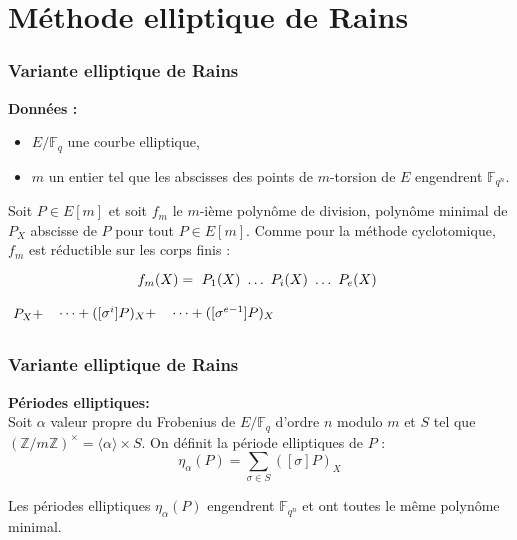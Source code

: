 \documentclass{beamer} %
\numberwithin{equation}{section}
\newcommand\zmodninv[1]{(\mathbb{Z}/#1\mathbb{Z})^{\times}}
\newcommand\GF[1]{\mathbb{F}_{#1}}
\newcommand\groupgen[1]{\langle{#1}\rangle}
\begin{document}
\section{Méthode elliptique de Rains}
\begin{frame}
\frametitle{Variante elliptique de Rains}
\textbf{Données :}
\begin{itemize}
	\item $E/\GF{q}$ une courbe elliptique,
	\item $m$ un entier tel que les abscisses des points de $m$-torsion de $E$
engendrent $\GF{q^n}$.
\end{itemize}
\vspace{0.3cm}
Soit $P\in E[m]$ et soit $f_m$ le $m$-ième polynôme de division, polynôme minimal de
$P_X$ abscisse de $P$ pour tout $P\in E[m]$. Comme pour la méthode cyclotomique,
$f_m$ est réductible sur les corps finis :
\begin{equation*}
f_m(X) = \tikz[baseline]{\node[anchor=base] (t1) {$P_1(X)$};} \dots 
\tikz[baseline]{\node[anchor=base] (t2) {$P_i(X)$};}
\dots 
\tikz[baseline]{\node[anchor=base] (t3) {$P_e(X)$};}
\end{equation*}
\hspace{3cm}
$\tikz\node [] (n1) {$P_X +$};$
$\tikz\node [] (n2) {$\dots +([\sigma^i]P)_X + $};$
$\tikz\node [] (n3) {$\dots +([\sigma^{e-1}]P)_X$};$



\end{frame}
\begin{frame}
\frametitle{Variante elliptique de Rains}
\textbf{Périodes elliptiques: }\\
Soit $\alpha$ valeur propre du Frobenius de $E/\GF{q}$ d'ordre $n$ modulo $m$ et
$S$ tel que $\zmodninv{m} = \groupgen{\alpha}\times S$. On définit la période
elliptiques de $P$ :
\[\eta_{\alpha}(P)=\sum_{\sigma\in S}{([\sigma]P)_X}\]
\begin{framed}
\begin{conj}
Les périodes elliptiques $\eta_{\alpha}(P)$ engendrent $\GF{q^n}$ et ont toutes 
le même polynôme minimal.
\end{conj}
\end{framed}
\end{frame}
\end{document}
